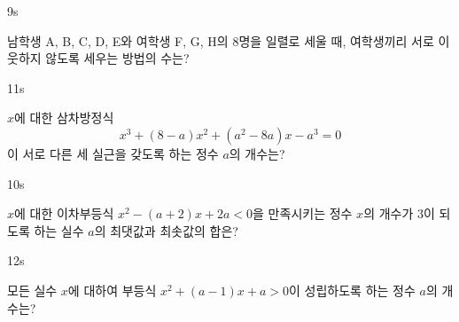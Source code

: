 \documentclass[10pt]{article}
\begin{document}
\begin{pagepair}
\noindent
\begin{minipage}[t][\probboxheight][t]{0.46\linewidth}
\begin{problem}{9}{s}
\par\smallskip
남학생 A, B, C, D, E와 여학생 F, G, H의 $8$명을 일렬로 세울 때, 여학생끼리 서로 이웃하지 않도록 세우는 방법의 수는?
\begin{choices}
\end{choices}
\end{problem}
\end{minipage}\hfill
\begin{minipage}[t][\probboxheight][t]{0.46\linewidth}
\begin{problem}{11}{s}
\par\smallskip
$x$에 대한 삼차방정식
\[ x^3 + (8 - a)x^2 + (a^2 - 8a)x - a^3 = 0 \]
이 서로 다른 세 실근을 갖도록 하는 정수 $a$의 개수는?
\begin{choices}
\end{choices}
\end{problem}
\end{minipage}
\par\vspace{4mm}
\noindent
\begin{minipage}[t][\probboxheight][t]{0.46\linewidth}
\begin{problem}{10}{s}
\par\smallskip
$x$에 대한 이차부등식 $x^2 - (a + 2)x + 2a < 0$을 만족시키는 정수 $x$의 개수가 $3$이 되도록 하는 실수 $a$의 최댓값과 최솟값의 합은?
\begin{choices}
\end{choices}
\end{problem}
\end{minipage}\hfill
\begin{minipage}[t][\probboxheight][t]{0.46\linewidth}
\begin{problem}{12}{s}
\par\smallskip
모든 실수 $x$에 대하여 부등식 $x^2 + (a - 1)x + a > 0$이 성립하도록 하는 정수 $a$의 개수는?
\begin{choices}
\end{choices}
\end{problem}
\end{minipage}
\end{pagepair}
\end{document}
